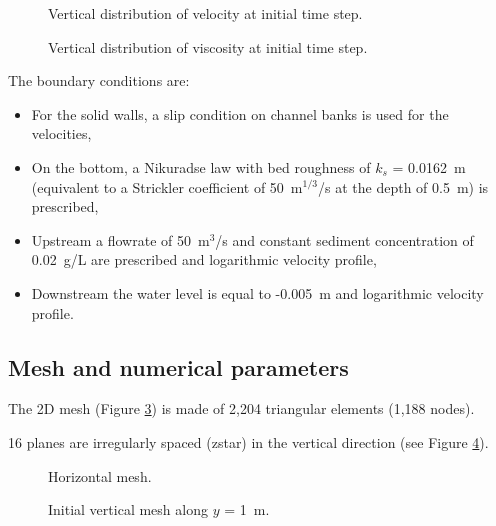 \begin{figure}[H]
  \centering
  \caption{Vertical distribution of velocity at initial time step.}
  \label{t3d:Rouse:Velot0}
\end{figure}

\begin{figure}[H]
  \centering
  \caption{Vertical distribution of viscosity at initial time step.}
  \label{t3d:Rouse:Visct0}
\end{figure}

The boundary conditions are:
\begin{itemize}
\item For the solid walls, a slip condition on channel banks is used for the
velocities,
\item On the bottom, a Nikuradse law with bed roughness of $k_s$ = 0.0162~m
(equivalent to a Strickler coefficient of 50~m$^{1/3}$/s at the depth of
0.5~m) is prescribed,
\item Upstream a flowrate of 50~m$^3$/s and constant sediment concentration of
0.02~g/L are prescribed and logarithmic velocity profile,
\item Downstream the water level is equal to -0.005~m and logarithmic velocity
profile.
\end{itemize}

\subsection{Mesh and numerical parameters}

The 2D mesh (Figure \ref{t3d:Rouse:fig:meshH})
is made of 2,204 triangular elements (1,188 nodes).

16 planes are irregularly spaced (zstar) in the vertical direction
(see Figure \ref{t3d:Rouse:fig:meshV}).

\begin{figure}[!htbp]
 \centering
 \caption{Horizontal mesh.}
 \label{t3d:Rouse:fig:meshH}
\end{figure}

\begin{figure}[!htbp]
 \centering
 \caption{Initial vertical mesh along $y$ = 1~m.}
 \label{t3d:Rouse:fig:meshV}
\end{figure}

